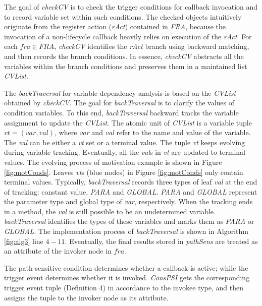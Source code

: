 The goal of \textit{checkCV} is to check the trigger conditions for callback invocation and to record variable set within such conditions. The checked objects intuitively originate from the register action (\textit{rAct}) contained in \textit{FRA}, because the invocation of a non-lifecycle callback heavily relies on execution of the \textit{rAct}. For each $fra\in FRA$, \textit{checkCV} identifies the \textit{rAct} branch using backward matching, and then records the branch conditions. In essence, \textit{checkCV} abstracts all the variables within the branch conditions and preserves them in a maintained list \textit{CVList}.

The \textit{backTraversal} for variable dependency analysis is based on the \textit{CVList} obtained by \textit{checkCV}. The goal for \textit{backTraversal} is to clarify the values of condition variables. To this end, \textit{backTraversal} backward tracks the variable assignment to update the \textit{CVList}. The atomic unit of \textit{CVList} is a variable tuple $\textit{vt} = (var, val)$, where \textit{var} and \textit{val} refer to the name and value of the variable. The \textit{val} can be either a \textit{vt} set or a terminal value. The tuple \textit{vt} keeps evolving during variable tracking. Eventually, all the \textit{val}s in \textit{vt} are updated to terminal values. The evolving process of motivation example is shown in Figure \ref{fig:motConds}. Leaves \textit{vt}s (blue nodes) in Figure \ref{fig:motConds} only contain terminal values. Typically, \textit{backTraversal} records three types of leaf \textit{val} at the end of tracking: constant value, \textit{PARA} and \textit{GLOBAL}. \textit{PARA} and \textit{GLOBAL} represent the parameter type and global type of \textit{var}, respectively. When the tracking ends in a method, the \textit{val} is still possible to be an undetermined variable. \textit{backTraversal} identifies the types of these variables and marks them as \textit{PARA} or \textit{GLOBAL}. The implementation process of \textit{backTraversal} is shown in Algorithm \ref{fig:alg3} line $4-11$. Eventually, the final results stored in \textit{pathSens} are treated as an attribute of the invoker node in $fra$.



The path-sensitive condition determines whether a callback is active; while the trigger event determines whether it is invoked.
\textit{ConsPSI} gets the corresponding trigger event tuple (Definition 4) in accordance to the invokee type, and then assigns the tuple to the invoker node as its attribute. 


